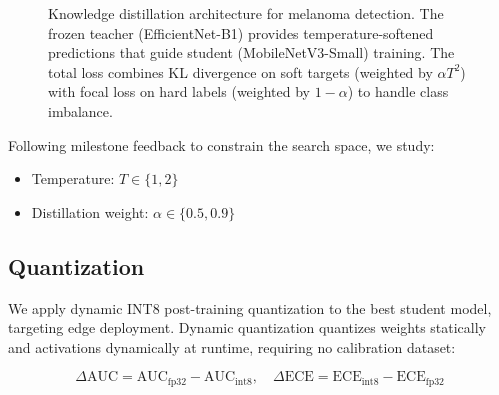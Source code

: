 \documentclass[conference]{IEEEtran}
\begin{document}
\begin{figure}[t]
\caption{Knowledge distillation architecture for melanoma detection. The frozen teacher (EfficientNet-B1) provides temperature-softened predictions that guide student (MobileNetV3-Small) training. The total loss combines KL divergence on soft targets (weighted by $\alpha T^2$) with focal loss on hard labels (weighted by $1-\alpha$) to handle class imbalance.}
\label{fig:kd_architecture}
\end{figure}

Following milestone feedback to constrain the search space, we study:
\begin{itemize}
    \item Temperature: $T \in \{1, 2\}$
    \item Distillation weight: $\alpha \in \{0.5, 0.9\}$
\end{itemize}

\subsection{Quantization}

We apply dynamic INT8 post-training quantization to the best student model, targeting edge deployment. Dynamic quantization quantizes weights statically and activations dynamically at runtime, requiring no calibration dataset:

\begin{equation}
\Delta\text{AUC} = \text{AUC}_{\text{fp32}} - \text{AUC}_{\text{int8}}, \quad \Delta\text{ECE} = \text{ECE}_{\text{int8}} - \text{ECE}_{\text{fp32}}
\end{equation}
\end{document}
